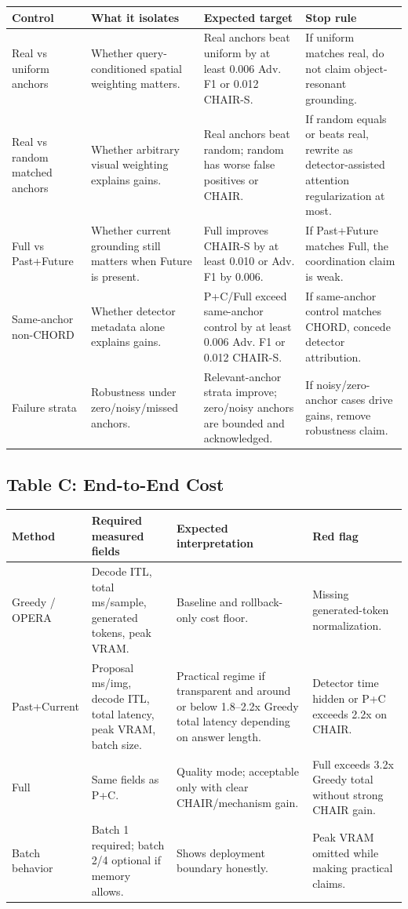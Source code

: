 \documentclass[10pt]{article}
\begin{document}
\begin{tabularx}{\textwidth}{@{}p{}Y Y Y@{}}
\toprule
Control & What it isolates & Expected target & Stop rule \\
\midrule
Real vs uniform anchors & Whether query-conditioned spatial weighting matters. & Real anchors beat uniform by at least 0.006 Adv. F1 or 0.012 CHAIR-S. & If uniform matches real, do not claim object-resonant grounding. \\
Real vs random matched anchors & Whether arbitrary visual weighting explains gains. & Real anchors beat random; random has worse false positives or CHAIR. & If random equals or beats real, rewrite as detector-assisted attention regularization at most. \\
Full vs Past+Future & Whether current grounding still matters when Future is present. & Full improves CHAIR-S by at least 0.010 or Adv. F1 by 0.006. & If Past+Future matches Full, the coordination claim is weak. \\
Same-anchor non-CHORD & Whether detector metadata alone explains gains. & P+C/Full exceed same-anchor control by at least 0.006 Adv. F1 or 0.012 CHAIR-S. & If same-anchor control matches CHORD, concede detector attribution. \\
Failure strata & Robustness under zero/noisy/missed anchors. & Relevant-anchor strata improve; zero/noisy anchors are bounded and acknowledged. & If noisy/zero-anchor cases drive gains, remove robustness claim. \\
\bottomrule
\end{tabularx}

\subsection*{Table C: End-to-End Cost}

\begin{tabularx}{\textwidth}{@{}p{}Y Y Y@{}}
\toprule
Method & Required measured fields & Expected interpretation & Red flag \\
\midrule
Greedy / OPERA & Decode ITL, total ms/sample, generated tokens, peak VRAM. & Baseline and rollback-only cost floor. & Missing generated-token normalization. \\
Past+Current & Proposal ms/img, decode ITL, total latency, peak VRAM, batch size. & Practical regime if transparent and around or below 1.8--2.2x Greedy total latency depending on answer length. & Detector time hidden or P+C exceeds 2.2x on CHAIR. \\
Full & Same fields as P+C. & Quality mode; acceptable only with clear CHAIR/mechanism gain. & Full exceeds 3.2x Greedy total without strong CHAIR gain. \\
Batch behavior & Batch 1 required; batch 2/4 optional if memory allows. & Shows deployment boundary honestly. & Peak VRAM omitted while making practical claims. \\
\bottomrule
\end{tabularx}
\end{document}
